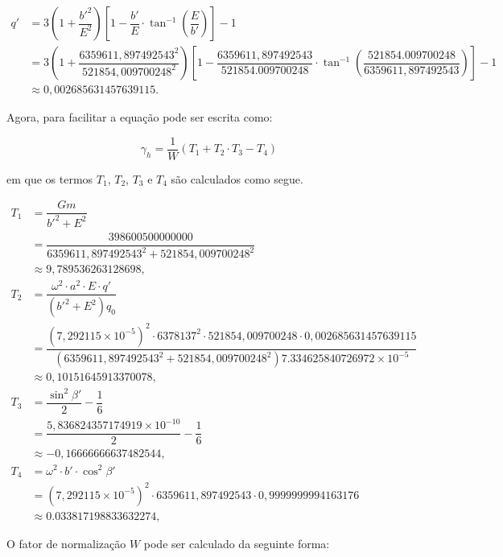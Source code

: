 \[
\begin{aligned}
   q'&= 3\left(1 + \dfrac{b'^2}{E^2}\right)\left[1 -\dfrac{b'}{E} \cdot \tan^{-1}\left(\dfrac{E}{b'}\right)\right] -1\\
     &= 3\left(1 + \dfrac{6359611{,}897492543^2}{521854{,}009700248^2}\right)\left[1 -\dfrac{6359611{,}897492543}{521854.009700248} \cdot \tan^{-1}\left(\dfrac{521854.009700248}{6359611{,}897492543}\right)\right] -1\\
     &\approx 0{,}002685631457639115 \text{.}
\end{aligned}
\]

\noindent
Agora, para facilitar a equação pode ser escrita como:

\[
\gamma_h = \frac{1}{W} \left( T_1 + T_2 \cdot T_3 - T_4 \right)
\]

\noindent
em que os termos \(T_1\), \(T_2\), \(T_3\) e \(T_4\) são calculados como segue.

\[
\begin{aligned}
   T_1 &= \dfrac{Gm}{b'^2 + E^2} \\
       &= \dfrac{398600500000000}{6359611{,}897492543^2 + 521854{,}009700248^2} \\
       &\approx 9{,}789536263128698 \text{,}  \\[10pt]
   T_2 &= \dfrac{\omega^2 \cdot a^2 \cdot E \cdot q'}{(b'^2 + E^2)q_0} \\
       &= \dfrac{(7{,}292115 \times 10^{-5})^2 \cdot 6378137^2 \cdot 521854{,}009700248 \cdot 0{,}002685631457639115}{(6359611{,}897492543^2 + 521854{,}009700248^2)7.334625840726972 \times 10^{-5}} \\
       &\approx 0{,}10151645913370078 \text{,} \\[10pt]
   T_3 &= \dfrac{\sin^2\beta'}{2} - \dfrac{1}{6}\\
       &= \dfrac{5{,}836824357174919 \times 10^{-10}}{2} - \dfrac{1}{6}\\
       &\approx -0{,}16666666637482544 \text{,} \\[10pt]
   T_4 &= \omega^2 \cdot b' \cdot \cos^2\beta' \\
       &= (7{,}292115 \times 10^{-5})^2 \cdot 6359611{,}897492543 \cdot 0{,}9999999994163176 \\
       &\approx 0.033817198833632274 \text{,}
\end{aligned}
\]




\noindent
O fator de normalização \(W\) pode ser calculado da seguinte forma:

